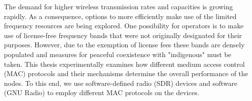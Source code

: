 The demand for higher wireless transmission rates and capacities is growing rapidly. As a consequence, options to more efficiently make use of the limited frequency resources are being explored. One possibility for operators is to make use of license-free frequency bands that were not originally designated for their purposes. However, due to the exemption of license fees these bands are densely populated and measures for peaceful coexistence with "indigenous" must be taken.
This thesis experimentally examines how different medium access control (MAC) protocols and their mechanisms determine the overall performance of the nodes. To this end, we use software-defined radio (SDR) devices and software (GNU Radio) to employ different MAC protocols on the devices.

